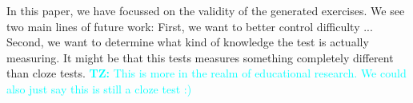 \documentclass[11pt,letterpaper]{article}
\newcommand{\tz}[1]{\textcolor{cyan}{\textbf{TZ:} #1}}
\newcommand{\tz}[1]{}
\begin{document}
In this paper, we have focussed on the validity of the generated exercises.
We see two main lines of future work:
First, we want to better control difficulty ...
Second, we want to determine what kind of knowledge the test is actually measuring.
It might be that this tests measures something completely different than cloze tests.
\tz{This is more in the realm of educational research. We could also just say this is still a cloze test :)}

 



\end{document}
